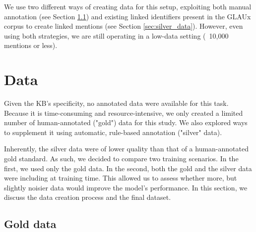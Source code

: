 \documentclass[final]{anthology-ch}
\begin{document}
We use two different ways of creating data for this setup, exploiting both manual annotation (see Section \ref{sec:gold_data}) and existing linked identifiers present in the GLAUx corpus to create linked mentions (see Section \ref{sec:silver_data}). However, even using both strategies, we are still operating in a low-data setting (~10,000 mentions or less).

\section{Data} \label{sec:data}
Given the KB's specificity, no annotated data were available for this task. Because it is time-consuming and resource-intensive, we only created a limited number of human-annotated ("gold") data for this study. We also explored ways to supplement it using automatic, rule-based annotation ("silver" data).

Inherently, the silver data were of lower quality than that of a human-annotated gold standard. As such, we decided to compare two training scenarios. In the first, we used only the gold data. In the second, both the gold and the silver data were including at training time. This allowed us to assess whether more, but slightly noisier data would improve the model's performance. In this section, we discuss the data creation process and the final dataset.

\subsection{Gold data} \label{sec:gold_data}
\end{document}
